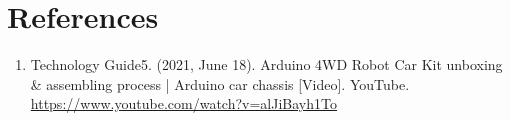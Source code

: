 \documentclass[12pt,a4paper]{article}
\begin{document}
\section*{References}
\begin{enumerate}
    \item Technology Guide5. (2021, June 18). Arduino 4WD Robot Car Kit unboxing \& assembling process | Arduino car chassis [Video]. YouTube. \url{https://www.youtube.com/watch?v=alJiBayh1To}
\end{enumerate}
\end{document}
